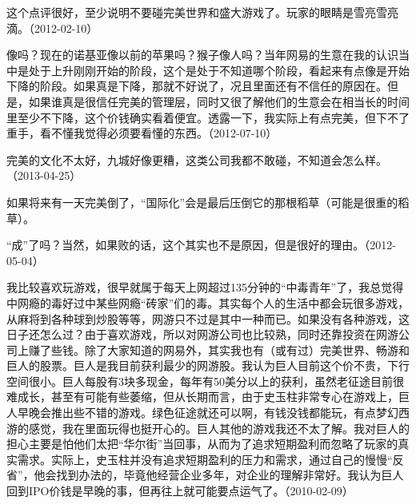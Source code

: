 这个点评很好，至少说明不要碰完美世界和盛大游戏了。玩家的眼睛是雪亮雪亮滴。（2012-02-10）


像吗？现在的诺基亚像以前的苹果吗？猴子像人吗？当年网易的生意在我的认识当中是处于上升刚刚开始的阶段，这个是处于不知道哪个阶段，看起来有点像是开始下降的阶段。如果真是下降，那就不好说了，况且里面还有不信任的原因在。但是，如果谁真是很信任完美的管理层，同时又很了解他们的生意会在相当长的时间里至少不下降，这个价钱确实看着便宜。透露一下，我实际上有点完美，但下不了重手，看不懂我觉得必须要看懂的东西。（2012-07-10）


完美的文化不太好，九城好像更糟，这类公司我都不敢碰，不知道会怎么样。（2013-04-25）


如果将来有一天完美倒了，“国际化”会是最后压倒它的那根稻草（可能是很重的稻草）。


“成”了吗？当然，如果败的话，这个其实也不是原因，但是很好的理由。（2012-05-04）


我比较喜欢玩游戏，很早就属于每天上网超过135分钟的“中毒青年”了，我总觉得中网瘾的毒好过中某些网瘾“砖家”们的毒。其实每个人的生活中都会玩很多游戏，从麻将到各种球到炒股等等，网游只不过是其中一种而已。如果没有各种游戏，这日子还怎么过？由于喜欢游戏，所以对网游公司也比较熟，同时还靠投资在网游公司上赚了些钱。除了大家知道的网易外，其实我也有（或有过）完美世界、畅游和巨人的股票。巨人是我目前获利最少的网游股。我认为巨人目前这个价不贵，下行空间很小。巨人每股有3块多现金，每年有50美分以上的获利，虽然老征途目前很难成长，甚至有可能有些萎缩，但从长期而言，由于史玉柱非常专心在游戏上，巨人早晚会推出些不错的游戏。绿色征途就还可以啊，有钱没钱都能玩，有点梦幻西游的感觉，我在里面玩得也挺开心的。巨人其他的游戏我还不太了解。我对巨人的担心主要是怕他们太把“华尔街”当回事，从而为了追求短期盈利而忽略了玩家的真实需求。实际上，史玉柱并没有追求短期盈利的压力和需求，通过自己的慢慢“反省”，他会找到办法的，毕竟他经营企业多年，对企业的理解非常好。我认为巨人回到IPO价钱是早晚的事，但再往上就可能要点运气了。（2010-02-09）


